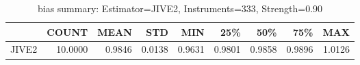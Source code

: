 \begin{table}[ht]
\centering
\caption{bias summary: Estimator=JIVE2, Instruments=333, Strength=0.90}
\begin{tabular}{lrrrrrrrr}
\toprule
 & COUNT & MEAN & STD & MIN & 25\% & 50\% & 75\% & MAX \\
\midrule
JIVE2 & 10.0000 & 0.9846 & 0.0138 & 0.9631 & 0.9801 & 0.9858 & 0.9896 & 1.0126 \\
\bottomrule
\end{tabular}
\end{table}
